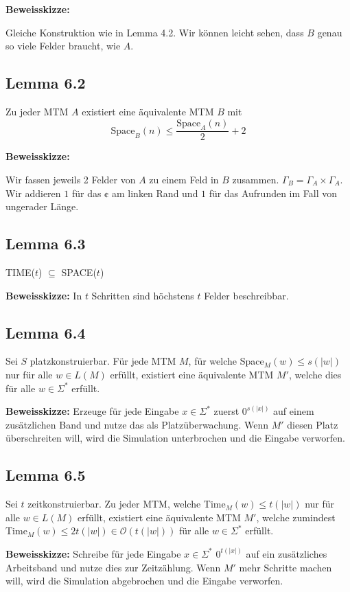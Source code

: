 \documentclass[a4paper, 11pt]{article}
\def\O{\mathcal{O}}
\begin{document}
    \textbf{Beweisskizze: }

    Gleiche Konstruktion wie in Lemma 4.2. Wir können leicht sehen, dass $B$ genau so viele Felder braucht, wie $A$.


    \subsection*{Lemma 6.2}
    Zu jeder MTM $A$ existiert eine äquivalente MTM $B$ mit 
    $$\text{Space}_B(n) \leq \frac{\text{Space}_A(n)}{2}+2$$

    \textbf{Beweisskizze: }

    Wir fassen jeweils 2 Felder von $A$ zu einem Feld in $B$ zusammen. $\Gamma_B = \Gamma_A \times \Gamma_A$. Wir addieren $1$ für das $\cent$ am linken Rand und $1$ für das Aufrunden im Fall von ungerader Länge.

    \subsection*{Lemma 6.3}
    TIME($t$) $\subseteq$ SPACE($t$)

    \textbf{Beweisskizze: }
    In $t$ Schritten sind höchstens $t$ Felder beschreibbar.

    \subsection*{Lemma 6.4}
    Sei $S$ platzkonstruierbar. Für jede MTM $M$, für welche Space$_M(w) \leq s(|w|)$ nur für alle $w \in L(M)$ erfüllt, existiert eine äquivalente MTM $M'$, welche dies für alle $w \in \Sigma^*$ erfüllt.

    \textbf{Beweisskizze: }
    Erzeuge für jede Eingabe $x \in \Sigma^*$ zuerst $0^{s(|x|)}$ auf einem zusätzlichen Band und nutze das als Platzüberwachung. Wenn $M'$ diesen Platz überschreiten will, wird die Simulation unterbrochen und die Eingabe verworfen.

    \subsection*{Lemma 6.5}
    Sei $t$ zeitkonstruierbar. Zu jeder MTM, welche Time$_M(w) \leq t(|w|)$ nur für alle $w \in L(M)$ erfüllt, existiert eine äquivalente MTM $M'$, welche zumindest Time$_M(w) \leq 2t(|w|) \in \O(t(|w|))$ für alle $w \in \Sigma^*$ erfüllt.

    \textbf{Beweisskizze: }
    Schreibe für jede Eingabe $x \in \Sigma^*$ $0^{t(|x|)}$ auf ein zusätzliches Arbeitsband und nutze dies zur Zeitzählung. Wenn $M'$ mehr Schritte machen will, wird die Simulation abgebrochen und die Eingabe verworfen.
\end{document}
